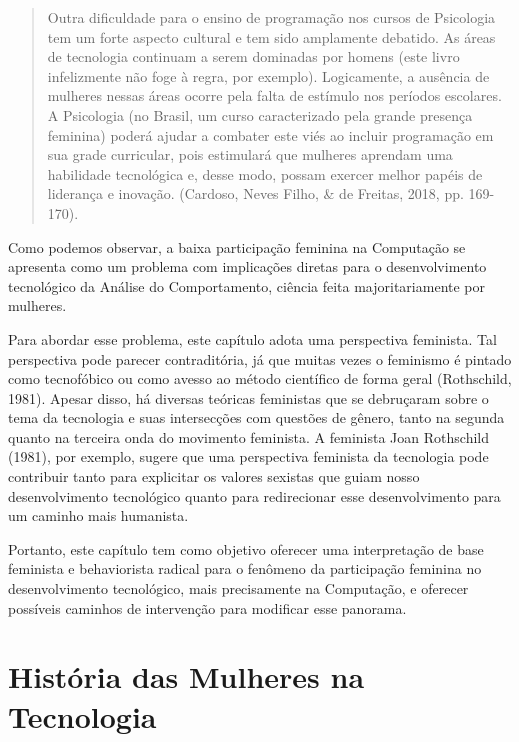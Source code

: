 \begin{quote}
    Outra dificuldade para o ensino de programação nos cursos de Psicologia tem um forte aspecto cultural e tem sido amplamente debatido. As áreas de tecnologia continuam a serem dominadas por homens (este livro infelizmente não foge à regra, por exemplo). Logicamente, a ausência de mulheres nessas áreas ocorre pela falta de estímulo nos períodos escolares. A Psicologia (no Brasil, um curso caracterizado pela grande presença feminina) poderá ajudar a combater este viés ao incluir programação em sua grade curricular, pois estimulará que mulheres aprendam uma habilidade tecnológica e, desse modo, possam exercer melhor papéis de liderança e inovação. (Cardoso, Neves Filho, \& de Freitas, 2018, pp. 169-170).
\end{quote}

Como podemos observar, a baixa participação feminina na Computação se apresenta como um problema com implicações diretas para o desenvolvimento tecnológico da Análise do Comportamento, ciência feita majoritariamente por mulheres. 

Para abordar esse problema, este capítulo adota uma perspectiva feminista. Tal perspectiva pode parecer contraditória, já que muitas vezes o feminismo é pintado como tecnofóbico ou como avesso ao método científico de forma geral (Rothschild, 1981). Apesar disso, há diversas teóricas feministas que se debruçaram sobre o tema da tecnologia e suas intersecções com questões de gênero, tanto na segunda quanto na terceira onda do movimento feminista. A feminista Joan Rothschild (1981), por exemplo, sugere que uma perspectiva feminista da tecnologia pode contribuir tanto para explicitar os valores sexistas que guiam nosso desenvolvimento tecnológico quanto para redirecionar esse desenvolvimento para um caminho mais humanista. 

Portanto, este capítulo tem como objetivo oferecer uma interpretação de base feminista e behaviorista radical para o fenômeno da participação feminina no desenvolvimento tecnológico, mais precisamente na Computação, e oferecer possíveis caminhos de intervenção para modificar esse panorama. 

\section{História das Mulheres na Tecnologia}

